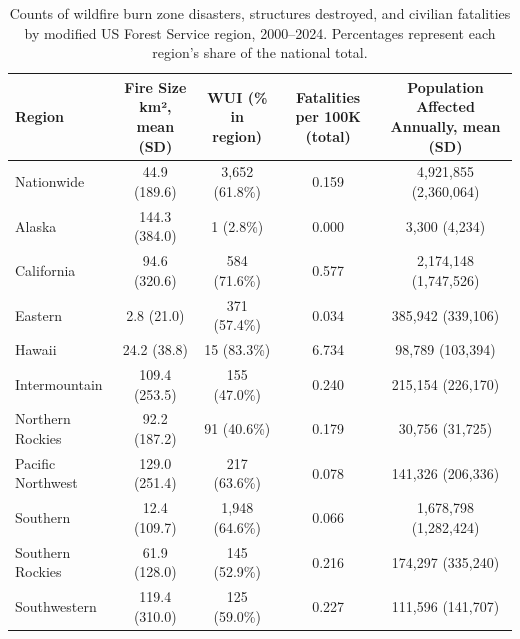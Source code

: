 \begin{table}[H]
\fontsize{6.0pt}{7.2pt}\selectfont
\begin{tabular*}{\linewidth}{@{\extracolsep{\fill}}lcccc}
\toprule
Region & Fire Size km²,
mean (SD) & WUI
(\% in region) & Fatalities per 100K
(total) & Population Affected Annually, mean (SD) \\ 
\midrule\addlinespace[2.5pt]
Nationwide & 44.9 (189.6) & 3,652 (61.8\%) &    0.159 & 4,921,855 (2,360,064) \\ 
Alaska & 144.3 (384.0) &     1 (2.8\%) &    0.000 & 3,300 (4,234) \\ 
California & 94.6 (320.6) &   584 (71.6\%) &    0.577 & 2,174,148 (1,747,526) \\ 
Eastern & 2.8 (21.0) &   371 (57.4\%) &    0.034 & 385,942 (339,106) \\ 
Hawaii & 24.2 (38.8) &    15 (83.3\%) &    6.734 & 98,789 (103,394) \\ 
Intermountain & 109.4 (253.5) &   155 (47.0\%) &    0.240 & 215,154 (226,170) \\ 
Northern Rockies & 92.2 (187.2) &    91 (40.6\%) &    0.179 & 30,756 (31,725) \\ 
Pacific Northwest & 129.0 (251.4) &   217 (63.6\%) &    0.078 & 141,326 (206,336) \\ 
Southern & 12.4 (109.7) & 1,948 (64.6\%) &    0.066 & 1,678,798 (1,282,424) \\ 
Southern Rockies & 61.9 (128.0) &   145 (52.9\%) &    0.216 & 174,297 (335,240) \\ 
Southwestern & 119.4 (310.0) &   125 (59.0\%) &    0.227 & 111,596 (141,707) \\ 
\bottomrule
\end{tabular*}
\caption{Counts of wildfire burn zone disasters, structures destroyed, and civilian fatalities by modified US Forest Service region, 2000--2024. Percentages represent each region's share of the national total.}
\label{tab:fire_characteristics}
\end{table}

